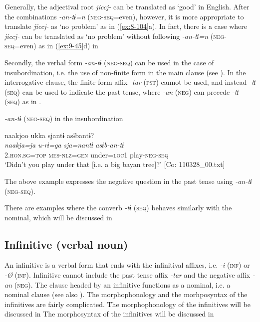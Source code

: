 Generally, the adjectival root \textit{jiccj-} can be translated as ‘good’ in English. After the combinations \textit{-an-tɨ=n} (\textsc{neg}-\textsc{seq}=even), however, it is more appropriate to translate \textit{jiccj-} as ‘no problem’ as in (\ref{ex:8-104}a). In fact, there is a case where \textit{jiccj-} can be translated as ‘no problem’ without following \textit{-an-tɨ=n} (\textsc{neg}-\textsc{seq}=even) as in (\ref{ex:9-45}d) in 

  Secondly, the verbal form \textit{-an-tɨ} (\textsc{neg}-\textsc{seq}) can be used in the case of insubordination, i.e. the use of non-finite form in the main clause (see ). In the interrogative clause, the finite-form affix \textit{-tar} (\textsc{pst}) cannot be used, and instead \textit{-tɨ} (\textsc{seq}) can be used to indicate the past tense, where \textit{-an} (\textsc{neg}) can precede \textit{-tɨ} (\textsc{seq}) as in .

\ea\label{ex:8-105}
  \textit{-an-tɨ} (\textsc{neg}-\textsc{seq}) in the insubordination

  {\TM}
\glll  naakjoo  ukka  sjantɨ  asɨbantɨ?\\
\textit{naakja=ja}  \textit{u-rɨ=ga}  \textit{sja=nantɨ}  \textit{asɨb-an-tɨ}\\
    2.\textsc{hon}.\textsc{sg}=\textsc{top}  \textsc{mes}-\textsc{nlz}=\textsc{gen}  under=\textsc{loc}1  play-\textsc{neg}-\textsc{seq}\\
\glt ‘Didn’t you play under that [i.e. a big bayan tree]?’ [Co: 110328\_00.txt]
\z

The above example expresses the negative question in the past tense using \textit{-an-tɨ} (\textsc{neg}-\textsc{seq}).

  There are examples where the converb \textit{-tɨ} (\textsc{seq}) behaves similarly with the nominal, which will be discussed in 

\subsection{Infinitive (verbal noun)}

An infinitive is a verbal form that ends with the infinitival affixes, i.e. \textit{-i} (\textsc{inf}) or \textit{-Ø} (\textsc{inf}). Infinitive cannot include the past tense affix \textit{-tar} and the negative affix \textit{-an} (\textsc{neg}). The clause headed by an infinitive functions as a nominal, i.e. a nominal clause (see also ). The morphophonology and the morhposyntax of the infinitives are fairly complicated. The morphophonology of the infinitives will be discussed in  The morphosyntax of the infinitives will be discussed in 

